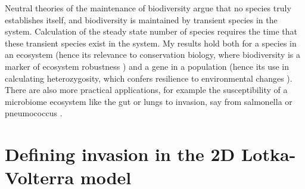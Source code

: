 Neutral theories of the maintenance of biodiversity argue that no species truly establishes itself, and biodiversity is maintained by transient species in the system. 
Calculation of the steady state number of species requires the time that these transient species exist in the system. 
My results hold both for a species in an ecosystem (hence its relevance to conservation biology, where biodiversity is a marker of ecosystem robustness \cite{Peterson1997,McKane2003,Green2005,Bickford2007}) and a gene in a population (hence its use in calculating heterozygosity, which confers resilience to environmental changes \cite{Kimura1971,Kawecki2004,Korolev2011,Pennings2014}). 
There are also more practical applications, for example the susceptibility of a microbiome ecosystem like the gut or lungs to invasion, say from salmonella or pneumococcus \cite{Kinross2011,Koenig2011,Roeselers2011,Fisher2014a,Theriot2014,Corander2017,Amor2019}. 

\iffalse
Transient coexistence during the fixation/extinction process of immigrants/mutants has also been proposed as a mechanism for observed biodiversity in a number of contexts \cite{Kimura1964,Dias1996,Hubbell2001,Chesson2000,Leibold2006,Kessler2015,Vega2017}. 
The extent of this biodiversity is constrained by the interplay between the residence times of these invaders and the rate at which they appear in a settled population. 
In the previous sections we calculated the fixation times in the two species system starting from the deterministically stable fixed point. 
In this section we investigate the complementary problem of robustness of a stable population of one species with respect to an invasion of another species, arising either through mutation or immigration, and investigate the effect of niche overlap and system size on the probability and mean times of successful and failed invasions. 
\fi


\section{Defining invasion in the 2D Lotka-Volterra model}

